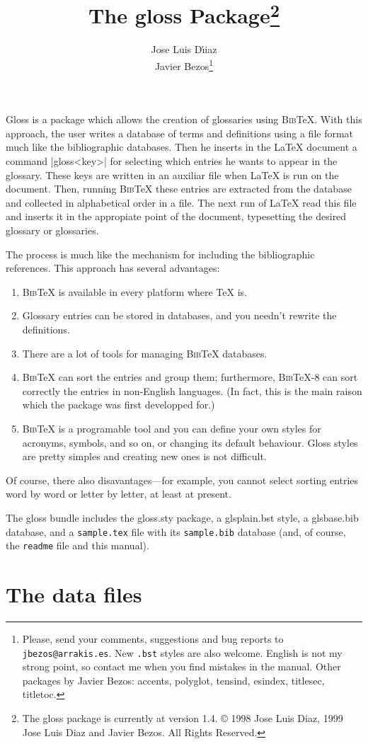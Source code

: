 \documentclass{ltxguide}
\title{The \textsf{gloss} Package\footnote{The
\textsf{gloss} package is currently at version 1.4. \copyright{} 
1998 Jose Luis Diaz,
1999 Jose Luis Diaz and Javier Bezos. All Rights Reserved.}}
\author{Jose Luis D\'{\i}iaz\\Javier Bezos\footnote{Please, send your 
comments, suggestions and bug reports to \texttt{jbezos@arrakis.es}.  
New \texttt{.bst} styles are also welcome.  English is not my strong 
point, so contact me when you find mistakes in the manual.  Other 
packages by Javier Bezos: \textsf{accents, polyglot, tensind, esindex, 
titlesec, titletoc}.}}
\date{\docdate}
\newcommand{\gloss}{\textsf{gloss}}
\newcommand{\bibTeX}{\textsc{Bib}\TeX}
\begin{document}
\maketitle

\textsf{Gloss} is a package which allows the creation of glossaries 
using \bibTeX. With this approach, the user writes a database of terms 
and definitions using a file format much like the bibliographic 
databases.  Then he inserts in the \LaTeX{} document a command 
|\gloss{<key>}| for selecting which entries he wants to appear in the 
glossary.  These keys are written in an auxiliar file when \LaTeX{} is 
run on the document.  Then, running \bibTeX{} these entries are 
extracted from the database and collected in alphabetical order in a 
file.  The next run of \LaTeX{} read this file and inserts it in the 
appropiate point of the document, typesetting the desired glossary or 
glossaries.

The process is much like the mechanism for including the bibliographic
references. This approach has several advantages:
\begin{enumerate}
\item \bibTeX{} is available in every platform where \TeX{} is.
\item Glossary entries can be stored in databases, and you needn't
  rewrite the definitions.
\item There are a lot of tools for managing \bibTeX{} databases.
\item \bibTeX{} can sort the entries and group them; furthermore,
  \bibTeX-8 can sort correctly the entries in non-English
  languages. (In fact, this is the main raison which the package
  was first developped for.)
\item \bibTeX{} is a programable tool and you can define your own 
  styles for acronyms, symbols, and so on, or changing its default 
  behaviour.  \textsf{Gloss} styles are pretty simples and creating
  new ones is not difficult.
\end{enumerate}

Of course, there also disavantages---for example, you cannot
select sorting entries word by word or letter by letter, at least
at present.

The gloss{} bundle includes the \textsf{gloss}.sty package, a 
\textsf{glsplain}.bst style, a \textsf{glsbase}.bib database, and a 
\texttt{sample.tex} file with its \texttt{sample.bib} database 
(and, of course, the \texttt{readme} file and this manual).

\section{The data files}
\end{document}

